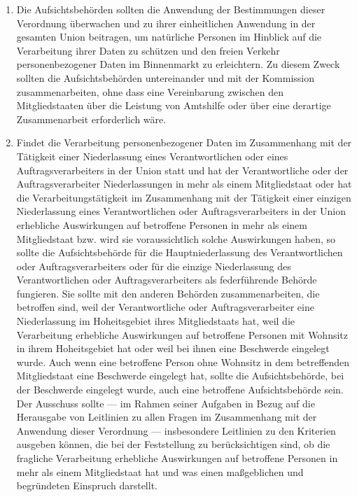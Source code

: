 \begin{enumerate}

   \item Die Aufsichtsbehörden sollten die Anwendung der Bestimmungen dieser Verordnung überwachen und zu ihrer
    einheitlichen Anwendung in der gesamten Union beitragen, um natürliche Personen im Hinblick auf die Verarbeitung
    ihrer Daten zu schützen und den freien Verkehr personenbezogener Daten im Binnenmarkt zu erleichtern. Zu diesem
    Zweck sollten die Aufsichtsbehörden untereinander und mit der Kommission zusammenarbeiten, ohne dass eine
    Vereinbarung zwischen den Mitgliedstaaten über die Leistung von Amtshilfe oder über eine derartige Zusammenarbeit
    erforderlich wäre.%
   \label{eg:123}
   

   \item Findet die Verarbeitung personenbezogener Daten im Zusammenhang mit der Tätigkeit einer Niederlassung eines
    Verantwortlichen oder eines Auftragsverarbeiters in der Union statt und hat der Verantwortliche oder der
    Auftragsverarbeiter Niederlassungen in mehr als einem Mitgliedstaat oder hat die Verarbeitungstätigkeit im
    Zusammenhang mit der Tätigkeit einer einzigen Niederlassung eines Verantwortlichen oder Auftragsverarbeiters in der
    Union erhebliche Auswirkungen auf betroffene Personen in mehr als einem Mitgliedstaat bzw. wird sie voraussichtlich
    solche Auswirkungen haben, so sollte die Aufsichtsbehörde für die Hauptniederlassung des Verantwortlichen oder
    Auftragsverarbeiters oder für die einzige Niederlassung des Verantwortlichen oder Auftragsverarbeiters als
    federführende Behörde fungieren. Sie sollte mit den anderen Behörden zusammenarbeiten, die betroffen sind, weil der
    Verantwortliche oder Auftragsverarbeiter eine Niederlassung im Hoheitsgebiet ihres Mitgliedstaats hat, weil die
    Verarbeitung erhebliche Auswirkungen auf betroffene Personen mit Wohnsitz in ihrem Hoheitsgebiet hat oder weil bei
    ihnen eine Beschwerde eingelegt wurde. Auch wenn eine betroffene Person ohne Wohnsitz in dem betreffenden
    Mitgliedstaat eine Beschwerde eingelegt hat, sollte die Aufsichtsbehörde, bei der Beschwerde eingelegt wurde, auch
    eine betroffene Aufsichtsbehörde sein. Der Ausschuss sollte — im Rahmen seiner Aufgaben in Bezug auf die Herausgabe
    von Leitlinien zu allen Fragen im Zusammenhang mit der Anwendung dieser Verordnung — insbesondere Leitlinien zu den
    Kriterien ausgeben können, die bei der Feststellung zu berücksichtigen sind, ob die fragliche Verarbeitung
    erhebliche Auswirkungen auf betroffene Personen in mehr als einem Mitgliedstaat hat und was einen maßgeblichen und
    begründeten Einspruch darstellt.%
   \label{eg:124}
   

\end{enumerate}
